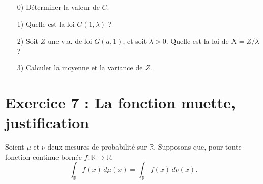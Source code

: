\documentclass[12pt,a4paper]{article}
\begin{document}
\begin{enumerate}
    \item[0)] Déterminer la valeur de $C$.
    \item[1)] Quelle est la loi $G(1,\lambda)$ ?
    \item[2)] Soit $Z$ une v.a. de loi $G(a,1)$, et soit $\lambda > 0$. Quelle est la loi de $X = Z/\lambda$ ?
    \item[3)] Calculer la moyenne et la variance de $Z$.
\end{enumerate}

\bigskip

\section*{Exercice 7 : La fonction muette, justification}

Soient $\mu$ et $\nu$ deux mesures de probabilité sur $\mathbb{R}$. Supposons que, pour toute fonction continue bornée $f : \mathbb{R} \to \mathbb{R}$,
\[
\int_{\mathbb{R}} f(x) \, d\mu(x) = \int_{\mathbb{R}} f(x) \, d\nu(x).
\]
\end{document}
